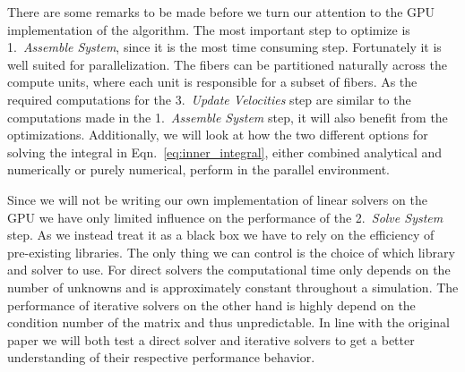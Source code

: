 There are some remarks to be made before we turn our attention to the GPU implementation of the algorithm. The most important step to optimize is 1.~\emph{Assemble System}, since it is the most time consuming step. Fortunately it is well suited for parallelization. The fibers can be partitioned naturally across the compute units, where each unit is responsible for a subset of fibers. As the required computations for the 3.~\emph{Update Velocities} step are similar to the computations made in the 1.~\emph{Assemble System} step, it will also benefit from the optimizations. Additionally, we will look at how the two different options for solving the integral in Eqn.~\ref{eq:inner_integral}, either combined analytical and numerically or purely numerical, perform in the parallel environment.

Since we will not be writing our own implementation of linear solvers on the GPU we have only limited influence on the performance of the 2.~\emph{Solve System} step. As we instead treat it as a black box we have to rely on the efficiency of pre-existing libraries. The only thing we can control is the choice of which library and solver to use. For direct solvers the computational time only depends on the number of unknowns and is approximately constant throughout a simulation. The performance of iterative solvers on the other hand is highly depend on the condition number of the matrix and thus unpredictable. In line with the original paper we will both test a direct solver and iterative solvers to get a better understanding of their respective performance behavior.

